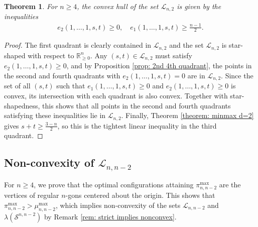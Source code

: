 \documentclass[reqno,hidelinks,11pt]{amsart}
\numberwithin{equation}{section}
\newtheorem{theorem}{Theorem}[section]
\def\RR{\mathbb{R}}
\def\S{\mathcal{S}}
\begin{document}
\begin{theorem}\label{theorem: convex hull Ln2}
    For $n \geq 4$, the convex hull of the set $\mathcal{L}_{n,2}$ is given by the inequalities 
    \begin{align*}
        e_2(1,\dots,1,s,t)\ge0, \quad e_1(1,\dots,1,s,t)\ge\frac{n-1}2.
    \end{align*}
\end{theorem}
\begin{proof} 
    The first quadrant is clearly contained in $\mathcal{L}_{n,2}$ and the set $\mathcal{L}_{n,2}$ is star-shaped with respect to $\RR_{\ge 0}^n$.
    Any $(s,t) \in \mathcal{L}_{n,2}$ must satisfy $e_2(1,\ldots,1,s,t) \geq 0$, and by Proposition \ref{prop: 2nd 4th quadrant}, the points in the second and fourth quadrants with $e_2(1,\dots,1,s,t)=0$ are in $\mathcal{L}_{n,2}$. Since the set of all $(s,t)$ such that $e_1(1,\ldots,1,s,t) \geq 0$ and $e_2(1,\ldots,1,s,t) \geq 0$ is convex, its intersection with each quadrant is also convex. Together with star-shapedness, this shows that all points in the second and fourth quadrants satisfying these inequalities lie in $\mathcal{L}_{n,2}$. Finally, Theorem \ref{theorem: minmax d=2} gives $s+t\ge\frac{3-n}2$, so this is the tightest linear inequality in the third quadrant. 
\end{proof}

\subsection{Non-convexity of \texorpdfstring{$\mathcal{L}_{n,n-2}$}{Ln,n-2}}
For $n\geq 4$, we prove that the optimal configurations attaining $\pi_{n,n-2}^{\max}$ are the vertices of regular $n$-gons centered about the origin. This shows that $\pi_{n,n-2}^{\max} > \mu_{n,n-2}^{\max}$, which implies non-convexity of the sets $\mathcal{L}_{n,n-2}$ and $\lambda(\S^{n,n-2})$ by Remark \ref{rem: strict implies nonconvex}. 
\end{document}
